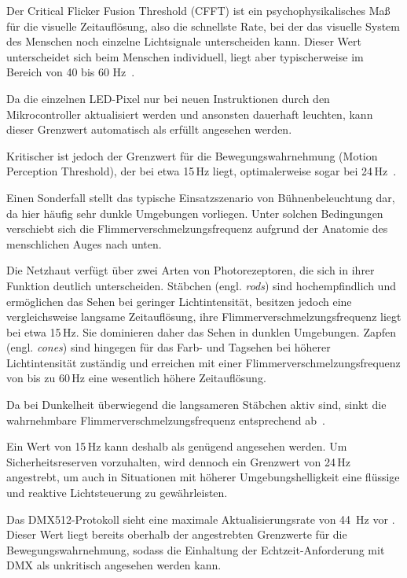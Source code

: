 Der Critical Flicker Fusion Threshold (CFFT) ist ein psychophysikalisches Maß 
für die visuelle Zeitauflösung, also die schnellste Rate, bei der das visuelle 
System des Menschen noch einzelne Lichtsignale unterscheiden kann. Dieser Wert 
unterscheidet sich beim Menschen individuell, liegt aber typischerweise im 
Bereich von 40 bis 60 Hz~\cite{haarlem2024speed}. 

Da die einzelnen LED-Pixel nur bei neuen Instruktionen durch den Mikrocontroller
aktualisiert werden und ansonsten dauerhaft leuchten, kann dieser Grenzwert automatisch
als erfüllt angesehen werden. 

Kritischer ist jedoch der Grenzwert für die Bewegungswahrnehmung (Motion Perception Threshold), 
der bei etwa 15\,Hz liegt, optimalerweise sogar bei 24\,Hz~\cite{fujii2018}.

Einen Sonderfall stellt das typische Einsatzszenario von Bühnenbeleuchtung dar, da hier häufig 
sehr dunkle Umgebungen vorliegen. Unter solchen Bedingungen verschiebt sich die 
Flimmerverschmelzungsfrequenz aufgrund der Anatomie des menschlichen Auges nach unten.

Die Netzhaut verfügt über zwei Arten von Photorezeptoren, die sich in ihrer Funktion 
deutlich unterscheiden. Stäbchen (engl. \textit{rods}) sind hochempfindlich und ermöglichen 
das Sehen bei geringer Lichtintensität, besitzen jedoch eine vergleichsweise langsame 
Zeitauflösung, ihre Flimmerverschmelzungsfrequenz liegt bei etwa 15\,Hz. Sie dominieren 
daher das Sehen in dunklen Umgebungen. Zapfen (engl. \textit{cones}) sind hingegen für 
das Farb- und Tagsehen bei höherer Lichtintensität zuständig und erreichen mit einer 
Flimmerverschmelzungsfrequenz von bis zu 60\,Hz eine wesentlich höhere
Zeitauflösung.

Da bei Dunkelheit überwiegend die langsameren Stäbchen aktiv sind, sinkt die wahrnehmbare 
Flimmerverschmelzungsfrequenz entsprechend ab~\cite{ramunae2025}.

Ein Wert von 15\,Hz kann deshalb als genügend angesehen werden. Um
Sicherheitsreserven vorzuhalten, wird dennoch ein Grenzwert von 24\,Hz angestrebt, 
um auch in Situationen mit höherer Umgebungshelligkeit eine flüssige und reaktive 
Lichtsteuerung zu gewährleisten.

Das DMX512-Protokoll sieht eine maximale Aktualisierungsrate von 44~Hz
vor \cite{ANSI_E1.11_2024,yang2015real}. Dieser Wert liegt bereits oberhalb der angestrebten Grenzwerte
für die Bewegungswahrnehmung, sodass die Einhaltung der Echtzeit-Anforderung 
mit DMX als unkritisch angesehen werden kann.

